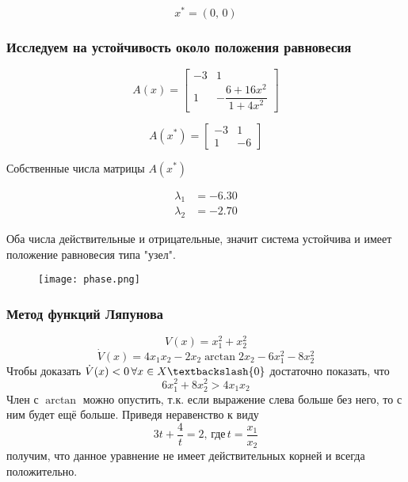     \[x^* = (0,\,0)\]

    \subsubsection*{Исследуем на устойчивость около положения равновесия}
    \begin{equation*}
        A(x) =
        \begin{bmatrix}
            -3& 1\\
            1& -\dfrac{6 + 16x^2}{1 + 4x^2}
        \end{bmatrix}
    \end{equation*}

    \begin{equation*}
        A(x^*) =
        \begin{bmatrix}
            -3& 1\\
            1& -6
        \end{bmatrix}
    \end{equation*}

    Собственные числа матрицы $A(x^*)$

    \begin{equation*}
        \begin{aligned}
            \lambda_1 &= -6.30 \\
            \lambda_2 &= -2.70
        \end{aligned}
    \end{equation*}

    Оба числа действительные и отрицательные, значит система устойчива и имеет положение равновесия типа "узел".

    \begin{figure}[H]
        \centering
        \texttt{[image: phase.png]}
        \caption{}
    \end{figure}

    \subsubsection*{Метод функций Ляпунова}
    \[V(x) = x_1^2 + x_2^2\]
    \[\dot{V}(x) = 4x_1 x_2 - 2x_2\arctan{2x_2} - 6x_1^2 - 8x_2^2\]
    Чтобы доказать $\dot{V}(x) < 0\, \forall x \in X \textbackslash \{0\}$ достаточно показать, что
    \[6x_1^2 + 8x_2^2 > 4x_1 x_2\]
    Член с $\arctan$ можно опустить, т.к. если выражение слева больше без него, то с ним будет ещё больше.
    Приведя неравенство к виду \[3t + \dfrac{4}{t} = 2,\,\mbox{где}\,t = \dfrac{x_1}{x_2}\] получим, что данное уравнение не
    имеет действительных корней и всегда положительно.

